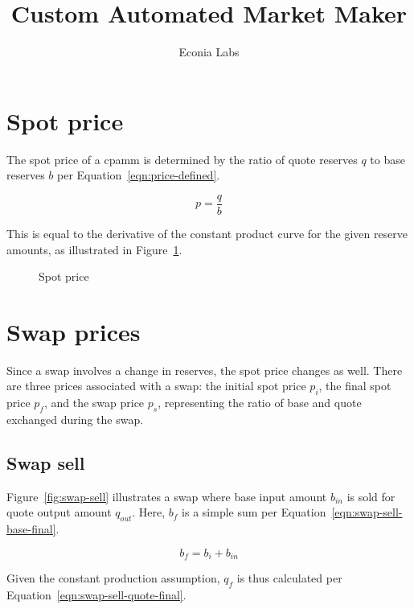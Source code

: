 \documentclass[table, twocolumn]{article}
\title{Custom Automated Market Maker}
\author{Econia Labs}
\date{}
\begin{document}

\maketitle

\section{Spot price}\label{sec:spot-price}

The spot price of a \gls*{cpamm} is determined by the ratio of quote reserves $q$ to
base reserves $b$ per Equation~\ref{eqn:price-defined}.

\begin{equation}\label{eqn:price-defined}
	p = \frac{q}{b}
\end{equation}

This is equal to the derivative of the constant product curve for the given reserve
amounts, as illustrated in Figure~\ref{fig:spot-price}.

\begin{figure}[!htb]
	\centering
	
	\caption{Spot price}\label{fig:spot-price}
\end{figure}

\section{Swap prices}\label{sec:swap-prices}

Since a swap involves a change in reserves, the spot price changes as well. There are
three prices associated with a swap: the initial spot price $p_i$, the final spot price
$p_f$, and the swap price $p_s$, representing the ratio of base and quote exchanged
during the swap.

\subsection{Swap sell}\label{subsec:swap-sell}

Figure~\ref{fig:swap-sell} illustrates a swap where base input amount $b_{in}$ is sold
for quote output amount $q_{out}$. Here, $b_f$ is a simple sum per
Equation~\ref{eqn:swap-sell-base-final}.

\begin{equation}\label{eqn:swap-sell-base-final}
	b_f = b_i + b_{in}
\end{equation}

Given the constant production assumption, $q_f$ is thus calculated per
Equation~\ref{eqn:swap-sell-quote-final}.
\end{document}
